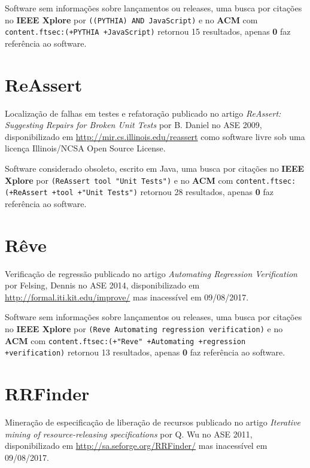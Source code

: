 Software sem informações sobre lançamentos ou releases,
uma busca por citações no {\bf IEEE Xplore} por
\texttt{((PYTHIA) AND JavaScript)}
e no {\bf ACM} com
\texttt{content.ftsec:(+PYTHIA +JavaScript)}
retornou
15 resultados, apenas
{\bf 0} faz referência ao software.



\section{ReAssert}

Localização de falhas em testes e refatoração
publicado no artigo {\it ReAssert: Suggesting Repairs for Broken Unit Tests}
por B. Daniel
no ASE 2009,
disponibilizado em \url{http://mir.cs.illinois.edu/reassert}
como software livre
sob uma licença Illinois/NCSA Open Source License.

Software considerado obsoleto,
escrito em Java,
uma busca por citações no {\bf IEEE Xplore} por
\texttt{(ReAssert tool "Unit Tests")}
e no {\bf ACM} com
\texttt{content.ftsec:(+ReAssert +tool +"Unit Tests")}
retornou
28 resultados, apenas
{\bf 0} faz referência ao software.



\section{Rêve}

Verificação de regressão
publicado no artigo {\it Automating Regression Verification}
por Felsing, Dennis
no ASE 2014,
disponibilizado em \url{http://formal.iti.kit.edu/improve/}
mas inacessível em 09/08/2017.

Software sem informações sobre lançamentos ou releases,
uma busca por citações no {\bf IEEE Xplore} por
\texttt{(Reve Automating regression verification)}
e no {\bf ACM} com
\texttt{content.ftsec:(+"Reve" +Automating +regression +verification)}
retornou
13 resultados, apenas
{\bf 0} faz referência ao software.



\section{RRFinder}

Mineração de especificação de liberação de recursos
publicado no artigo {\it Iterative mining of resource-releasing specifications}
por Q. Wu
no ASE 2011,
disponibilizado em \url{http://sa.seforge.org/RRFinder/}
mas inacessível em 09/08/2017.

